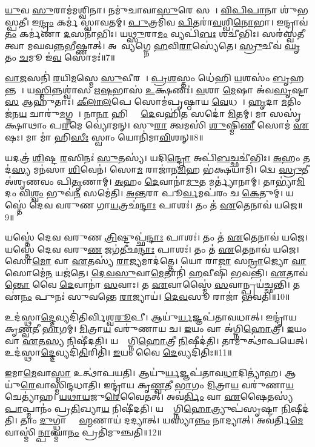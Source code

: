 \ul{𑌯𑍁}𑌵 \ul{𑌸𑍁}𑌰𑌾𑌮॑𑌮𑌶𑍍𑌵𑌿𑌨𑌾।
𑌨𑌮𑍁॑𑌚𑌾𑌵𑌾\ul{𑌸𑍁}𑌰𑍇 𑌸𑌚𑌾᳚।
\ul{𑌵𑌿}\ul{𑌪𑌿}\ul{𑌪𑌾}𑌨𑌾 𑌶𑍁॑𑌭𑌸𑍍𑌪𑌤𑍀।
𑌇\ul{𑌨𑍍𑌦𑍍𑌰𑌂} 𑌕𑌰𑍍𑌮॑ 𑌸𑍍𑌵𑌾𑌵𑌤𑌮𑍍।
\ul{𑌪𑍁}𑌤𑍍𑌰𑌮𑌿॑𑌵 \ul{𑌪𑌿}𑌤𑌰𑌾॑\ul{𑌵}𑌶𑍍𑌵𑌿\ul{𑌨𑍋}𑌭𑌾।
𑌇𑌨𑍍𑌦𑍍𑌰𑌾𑌵॑\ul{𑌤𑌂} 𑌕𑌰𑍍𑌮॑𑌣𑌾 \ul{𑌦}\ul{}𑌸𑌨𑌾॑𑌭𑌿𑌃।
𑌯\ul{𑌥𑍍𑌸𑍁}𑌰𑌾\ul{𑌮𑌂} 𑌵𑍍𑌯𑌪𑌿॑\ul{𑌬𑌃} 𑌶𑌚𑍀॑𑌭𑌿𑌃।
𑌸𑌰॑𑌸𑍍𑌵𑌤𑍀 𑌤𑍍𑌵𑌾 𑌮𑌘𑌵𑌨𑍍𑌨𑌭𑍀𑌷𑍍𑌣𑌾𑌤𑍍।
𑌅𑌹𑌾᳚𑌵𑍍𑌯𑌗𑍍𑌨𑍇 \ul{𑌹}𑌵𑌿\ul{𑌰𑌾}𑌸𑍍𑌯𑍇॑𑌤𑍇।
\ul{𑌸𑍍𑌰𑍁}𑌚𑍀𑌵॑ \ul{𑌘𑍃}𑌤𑌂 \ul{𑌚}𑌮𑍂 𑌇॑\ul{𑌵} 𑌸𑍋𑌮𑌃॑॥7॥

\ul{𑌵𑌾}\ul{𑌜}𑌸𑌨𑌿॑ \ul{𑌰}𑌯𑌿\ul{𑌮}𑌸𑍍𑌮𑍇 \ul{𑌸𑍁}𑌵𑍀𑌰𑌮𑍍᳚।
\ul{𑌪𑍍𑌰}\ul{𑌶}𑌸𑍍𑌤𑌂 𑌧𑍇॑𑌹𑌿 \ul{𑌯}𑌶𑌸𑌂॑ \ul{𑌬𑍃}𑌹𑌨𑍍𑌤𑌮𑍍᳚।
𑌯\ul{𑌸𑍍𑌮𑌿}𑌨𑍍𑌨𑌶𑍍𑌵𑌾॑𑌸 𑌋\ul{𑌷}𑌭𑌾𑌸॑ \ul{𑌉}𑌕𑍍𑌷𑌣𑌃॑।
\ul{𑌵}𑌶𑌾 \ul{𑌮𑍇}𑌷𑌾 𑌅॑𑌵\ul{𑌸𑍃}𑌷𑍍𑌟𑌾\ul{𑌸} 𑌆𑌹𑍁॑𑌤𑌾𑌃।
\ul{𑌕𑍀}\ul{𑌲𑌾}\ul{𑌲}𑌪𑍇 𑌸𑍋𑌮॑𑌪𑍃𑌷𑍍𑌠𑌾𑌯 \ul{𑌵𑍇}𑌧𑌸𑍇᳚।
\ul{𑌹𑍃}𑌦𑌾 \ul{𑌮}𑌤𑌿𑌂 𑌜॑𑌨\ul{𑌯} 𑌚𑌾𑌰𑍁॑\ul{𑌮}𑌗𑍍𑌨𑌯𑍇᳚।
𑌨𑌾\ul{𑌨𑌾} 𑌹𑌿 𑌵𑌾𑌂᳚ \ul{𑌦𑍇}𑌵𑌹𑌿॑\ul{𑌤}\ul{} 𑌸𑌦𑍋॑ \ul{𑌮𑌿}𑌤𑌮𑍍।
𑌮𑌾 𑌸𑌸𑍃॑𑌕𑍍𑌷𑌾𑌥𑌾𑌂 𑌪\ul{𑌰}𑌮𑍇 𑌵𑍍𑌯𑍋॑𑌮𑌨𑍍।
𑌸𑍁\ul{𑌰𑌾} 𑌤𑍍𑌵𑌮𑌸𑌿॑ \ul{𑌶𑍁}𑌷𑍍𑌮𑌿\ul{𑌣𑍀} 𑌸𑍋𑌮॑ \ul{𑌏}𑌷𑌃।
𑌮𑌾 𑌮𑌾॑ 𑌹𑌿\ul{𑌸𑍀𑌃} 𑌸𑍍𑌵𑌾𑌂 𑌯𑍋𑌨𑌿॑𑌮𑌾\ul{𑌵𑌿}𑌶𑌨𑍍॥8॥

𑌯𑌦𑌤𑍍𑌰॑ \ul{𑌶𑌿}𑌷𑍍𑌟 \ul{𑌰}𑌸𑌿𑌨𑌃॑ \ul{𑌸𑍁}𑌤𑌸𑍍𑌯॑।
𑌯𑌦𑌿\ul{𑌨𑍍𑌦𑍍𑌰𑍋} 𑌅𑌪𑌿॑\ul{𑌬}𑌚𑍍𑌛𑌚𑍀॑𑌭𑌿𑌃।
\ul{𑌅}𑌹𑌂 𑌤𑌦॑\ul{𑌸𑍍𑌯} 𑌮𑌨॑𑌸𑌾 \ul{𑌶𑌿}𑌵𑍇𑌨॑।
𑌸𑍋\ul{𑌮}\ul{} 𑌰𑌾𑌜𑌾॑𑌨\ul{𑌮𑌿}𑌹 𑌭॑𑌕𑍍𑌷𑌯𑌾𑌮𑌿।
𑌦𑍍𑌵𑍇 \ul{𑌸𑍍𑌰𑍁}𑌤𑍀 𑌅॑𑌶𑍃𑌣𑌵𑌂 𑌪𑌿\ul{𑌤𑍃}𑌣𑌾𑌮𑍍।
\ul{𑌅}𑌹𑌂 \ul{𑌦𑍇}𑌵𑌾𑌨𑌾॑\ul{𑌮𑍁}𑌤 𑌮𑌰𑍍𑌤𑍍𑌯𑌾॑𑌨𑌾𑌮𑍍।
𑌤𑌾𑌭𑍍𑌯𑌾॑\ul{𑌮𑌿}𑌦𑌂 𑌵𑌿\ul{𑌶𑍍𑌵𑌂} 𑌭𑍁𑌵॑\ul{𑌨}\ul{} 𑌸𑌮𑍇॑𑌤𑌿।
\ul{𑌅}\ul{𑌨𑍍𑌤}𑌰𑌾 𑌪𑍂\ul{𑌰𑍍𑌵}𑌮𑌪॑𑌰𑌂 𑌚 \ul{𑌕𑍇}𑌤𑍁𑌮𑍍।
𑌯𑌸𑍍𑌤𑍇॑ 𑌦𑍇𑌵 𑌵𑌰𑍁𑌣 𑌗𑌾\ul{𑌯}𑌤𑍍𑌰𑌛॑\ul{𑌨𑍍𑌦𑌾𑌃} 𑌪𑌾𑌶𑌃॑।
𑌤𑌂 𑌤॑ \ul{𑌏}𑌤𑍇𑌨𑌾𑌵॑ 𑌯𑌜𑍇॥9॥

𑌯𑌸𑍍𑌤𑍇॑ 𑌦𑍇𑌵 𑌵𑌰𑍁𑌣 \ul{𑌤𑍍𑌰𑌿}𑌷𑍍𑌟𑍁𑌪𑍍𑌛॑\ul{𑌨𑍍𑌦𑌾𑌃} 𑌪𑌾𑌶𑌃॑।
𑌤𑌂 𑌤॑ \ul{𑌏}𑌤𑍇𑌨𑌾𑌵॑ 𑌯𑌜𑍇।
𑌯𑌸𑍍𑌤𑍇॑ 𑌦𑍇𑌵 𑌵𑌰𑍁\ul{𑌣} 𑌜𑌗॑𑌤𑍀𑌛\ul{𑌨𑍍𑌦𑌾𑌃} 𑌪𑌾𑌶𑌃॑।
𑌤𑌂 𑌤॑ \ul{𑌏}𑌤𑍇𑌨𑌾𑌵॑ 𑌯𑌜𑍇।
𑌸𑍋\ul{𑌮𑍋} 𑌵𑌾 \ul{𑌏}𑌤𑌸𑍍𑌯॑ \ul{𑌰𑌾}𑌜𑍍𑌯𑌮𑌾𑌦॑𑌤𑍍𑌤𑍇।
𑌯𑍋 𑌰𑌾\ul{𑌜𑌾} 𑌸\ul{𑌨𑍍𑌰𑌾}𑌜𑍍𑌯𑍋 \ul{𑌵𑌾} 𑌸𑍋𑌮𑍇॑\ul{𑌨} 𑌯𑌜॑𑌤𑍇।
\ul{𑌦𑍇}\ul{𑌵}\ul{𑌸𑍁}𑌵𑌾\ul{𑌮𑍇}𑌤𑌾𑌨𑌿॑ \ul{𑌹}𑌵𑍀𑌷𑌿॑ 𑌭𑌵𑌨𑍍𑌤𑌿।
\ul{𑌏}𑌤𑌾𑌵॑\ul{𑌨𑍍𑌤𑍋} 𑌵𑍈 \ul{𑌦𑍇}𑌵𑌾𑌨𑌾॑ \ul{𑌸}𑌵𑌾𑌃।
𑌤 \ul{𑌏}𑌵𑌾𑌸𑍍𑌮𑍈॑ \ul{𑌸}𑌵𑌾𑌨𑍍𑌪𑍍𑌰𑌯॑𑌚𑍍𑌛𑌨𑍍𑌤𑌿।
𑌤 𑌏॑\ul{𑌨𑌂} 𑌪𑍁𑌨𑌃॑ 𑌸𑍁𑌵𑌨𑍍𑌤𑍇 \ul{𑌰𑌾}𑌜𑍍𑌯𑌾𑌯॑।
\ul{𑌦𑍇}\ul{𑌵}𑌸𑍂 𑌰𑌾𑌜𑌾॑ 𑌭𑌵𑌤𑌿॥10॥\anuvakamend[𑌸𑍋𑌮॑ 𑌆\ul{𑌵𑌿}𑌶𑌨𑍍 𑌯॑𑌜𑍇 \ul{𑌰𑌾}𑌜𑍍𑌯𑌾𑌯𑍈𑌕𑌂॑ 𑌚]

𑌉𑌦॑𑌸𑍍𑌥𑌾\ul{𑌦𑍍𑌦𑍇}𑌵𑍍𑌯𑌦𑌿॑𑌤𑌿𑌰𑍍𑌵𑌿𑌶𑍍𑌵\ul{𑌰𑍂}𑌪𑍀।
𑌆𑌯𑍁॑\ul{𑌰𑍍𑌯}𑌜𑍍𑌞𑌪॑𑌤𑌾𑌵𑌧𑌾𑌤𑍍।
𑌇𑌨𑍍𑌦𑍍𑌰𑌾॑𑌯 𑌕𑍃\ul{𑌣𑍍𑌵}𑌤𑍀 \ul{𑌭𑌾}𑌗𑌮𑍍।
\ul{𑌮𑌿}𑌤𑍍𑌰𑌾\ul{𑌯} 𑌵𑌰𑍁॑𑌣𑌾𑌯 𑌚।
\ul{𑌇}𑌯𑌂 𑌵𑌾 𑌅॑𑌗𑍍𑌨𑌿\ul{𑌹𑍋}𑌤𑍍𑌰𑍀।
\ul{𑌇}𑌯𑌂 𑌵𑌾 \ul{𑌏}𑌤\ul{𑌸𑍍𑌯} 𑌨𑌿𑌷𑍀॑𑌦𑌤𑌿।
𑌯𑌸𑍍𑌯𑌾᳚𑌗𑍍𑌨𑌿\ul{𑌹𑍋}𑌤𑍍𑌰𑍀 \ul{𑌨𑌿}𑌷𑍀𑌦॑𑌤𑌿।
𑌤𑌾𑌮𑍁𑌤𑍍𑌥𑌾॑𑌪𑌯𑍇𑌤𑍍।
𑌉𑌦॑𑌸𑍍𑌥𑌾\ul{𑌦𑍍𑌦𑍇}𑌵𑍍𑌯𑌦𑌿॑\ul{𑌤𑌿}𑌰𑌿𑌤𑌿॑।
\ul{𑌇}𑌯𑌂 𑌵𑍈 \ul{𑌦𑍇}𑌵𑍍𑌯𑌦𑌿॑𑌤𑌿𑌃॥11॥

\ul{𑌇}𑌮𑌾\ul{𑌮𑍇}𑌵𑌾\ul{𑌸𑍍𑌮𑌾} 𑌉𑌤𑍍𑌥𑌾॑𑌪𑌯𑌤𑌿।
𑌆𑌯𑍁॑\ul{𑌰𑍍𑌯}𑌜𑍍𑌞𑌪॑𑌤𑌾𑌵\ul{𑌧𑌾}𑌦𑌿𑌤𑍍𑌯𑌾॑𑌹।
𑌆𑌯𑍁॑\ul{𑌰𑍇}𑌵𑌾𑌸𑍍𑌮𑌿॑𑌨𑍍𑌦𑌧𑌾𑌤𑌿।
𑌇𑌨𑍍𑌦𑍍𑌰𑌾॑𑌯 𑌕𑍃\ul{𑌣𑍍𑌵}𑌤𑍀 \ul{𑌭𑌾}𑌗𑌂 \ul{𑌮𑌿}𑌤𑍍𑌰𑌾\ul{𑌯} 𑌵𑌰𑍁॑𑌣𑌾\ul{𑌯} 𑌚𑍇𑌤𑍍𑌯𑌾॑𑌹।
\ul{𑌯}\ul{𑌥𑌾}\ul{𑌯}𑌜𑍁\ul{𑌰𑍇}𑌵𑍈𑌤𑌤𑍍।
𑌅𑌵॑\ul{𑌰𑍍𑌤𑌿𑌂} 𑌵𑌾 \ul{𑌏}𑌷𑍈𑌤𑌸𑍍𑌯॑ \ul{𑌪𑌾}𑌪𑍍𑌮𑌾𑌨𑌂॑ 𑌪𑍍𑌰\ul{𑌤𑌿}𑌖𑍍𑌯𑌾\ul{𑌯} 𑌨𑌿𑌷𑍀॑𑌦𑌤𑌿।
𑌯𑌸𑍍𑌯𑌾᳚𑌗𑍍𑌨𑌿\ul{𑌹𑍋}𑌤𑍍𑌰𑍍𑌯𑍁𑌪॑𑌸𑍃𑌷𑍍𑌟𑌾 \ul{𑌨𑌿}𑌷𑍀𑌦॑𑌤𑌿।
𑌤𑌾𑌂 \ul{𑌦𑍁}𑌗𑍍𑌧𑍍𑌵𑌾 𑌬𑍍𑌰𑌾᳚\ul{𑌹𑍍𑌮}𑌣𑌾𑌯॑ 𑌦𑌦𑍍𑌯𑌾𑌤𑍍।
𑌯𑌸𑍍𑌯𑌾\ul{𑌨𑍍𑌨𑌂} 𑌨𑌾𑌦𑍍𑌯𑌾𑌤𑍍।
𑌅𑌵॑𑌰𑍍𑌤𑌿\ul{𑌮𑍇}𑌵𑌾𑌸𑍍𑌮𑌿॑\ul{𑌨𑍍𑌪𑌾}𑌪𑍍𑌮𑌾\ul{𑌨𑌂} 𑌪𑍍𑌰𑌤𑌿॑\-𑌮𑍁𑌞𑍍𑌚𑌤𑌿॥12॥

